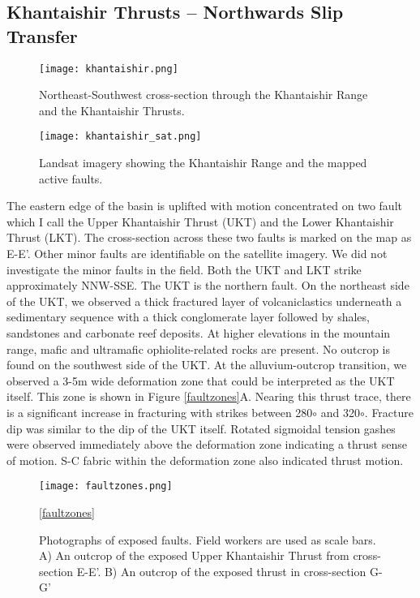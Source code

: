 \subsection{Khantaishir Thrusts -- Northwards Slip Transfer}
\begin{figure}[h!]
  \centering
  \texttt{[image: khantaishir.png]}
  \caption{Northeast-Southwest cross-section through the Khantaishir Range and the Khantaishir Thrusts.}
\end{figure}


\begin{figure}[h!]
  \centering
  \texttt{[image: khantaishir\_sat.png]}
  \caption{Landsat imagery showing the Khantaishir Range and the mapped active faults.}
\end{figure}

The eastern edge of the basin is uplifted with motion concentrated on two fault which I call the Upper Khantaishir Thrust (UKT) and the Lower Khantaishir Thrust (LKT). The cross-section across these two faults is marked on the map as E-E'. Other minor faults are identifiable on the satellite imagery. We did not investigate the minor faults in the field. Both the UKT and LKT strike approximately NNW-SSE. The UKT is the northern fault. On the northeast side of the UKT, we observed a thick fractured layer of volcaniclastics underneath a sedimentary sequence with a thick conglomerate layer followed by shales, sandstones and carbonate reef deposits. At higher elevations in the mountain range, mafic and ultramafic ophiolite-related rocks are present. No outcrop is found on the southwest side of the UKT. At the alluvium-outcrop transition, we observed a 3-5m wide deformation zone that could be interpreted as the UKT itself. This zone is shown in Figure \ref{faultzones}A. Nearing this thrust trace, there is a significant increase in fracturing with strikes between 280$\circ$ and 320$\circ$. Fracture dip was similar to the dip of the UKT itself. Rotated sigmoidal tension gashes were observed immediately above the deformation zone indicating a thrust sense of motion. S-C fabric within the deformation zone also indicated thrust motion.

\begin{figure}[h!]
  \centering
  \texttt{[image: faultzones.png]}
  \caption{Photographs of exposed faults. Field workers are used as scale bars. A) An outcrop of the exposed Upper Khantaishir Thrust from cross-section E-E'. B) An outcrop of the exposed thrust in cross-section G-G'}
  \ref{faultzones}
\end{figure}


